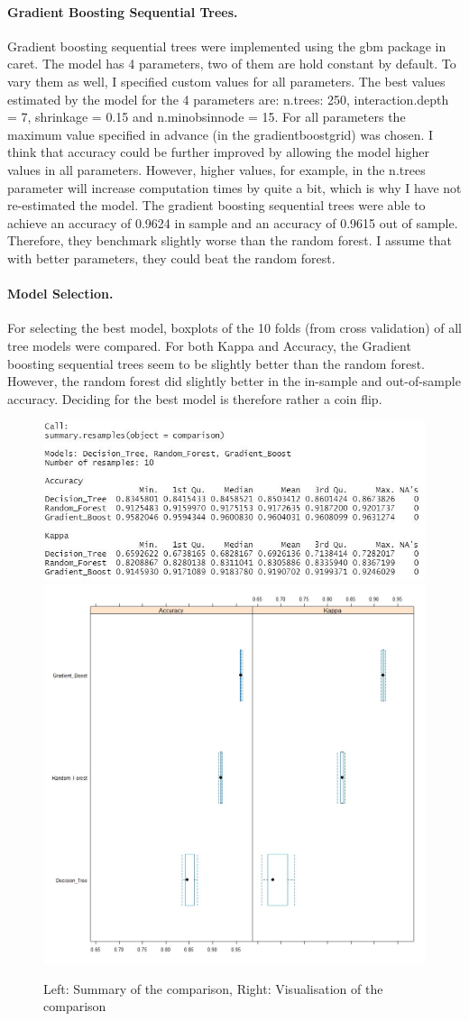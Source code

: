 \documentclass[
]{article}
\begin{document}
\hypertarget{gradient-boosting-sequential-trees.}{%
\paragraph{Gradient Boosting Sequential
Trees.}\label{gradient-boosting-sequential-trees.}}

Gradient boosting sequential trees were implemented using the gbm
package in caret. The model has 4 parameters, two of them are hold
constant by default. To vary them as well, I specified custom values for
all parameters. The best values estimated by the model for the 4
parameters are: n.trees: 250, interaction.depth = 7, shrinkage = 0.15
and n.minobsinnode = 15. For all parameters the maximum value specified
in advance (in the gradientboostgrid) was chosen. I think that accuracy
could be further improved by allowing the model higher values in all
parameters. However, higher values, for example, in the n.trees
parameter will increase computation times by quite a bit, which is why I
have not re-estimated the model. The gradient boosting sequential trees
were able to achieve an accuracy of 0.9624 in sample and an accuracy of
0.9615 out of sample. Therefore, they benchmark slightly worse than the
random forest. I assume that with better parameters, they could beat the
random forest.

\hypertarget{model-selection.}{%
\paragraph{Model Selection.}\label{model-selection.}}

For selecting the best model, boxplots of the 10 folds (from cross
validation) of all tree models were compared. For both Kappa and
Accuracy, the Gradient boosting sequential trees seem to be slightly
better than the random forest. However, the random forest did slightly
better in the in-sample and out-of-sample accuracy. Deciding for the
best model is therefore rather a coin flip.

\begin{figure}
  \includegraphics[width=.48\textwidth]{..//plots//comparison.jpg}
  \includegraphics[width=.48\textwidth]{..//plots//boxplotcomparison.jpg}
  \caption{Left: Summary of the comparison, Right: Visualisation of the comparison}\label{fig:foobar}
\end{figure}
\end{document}
